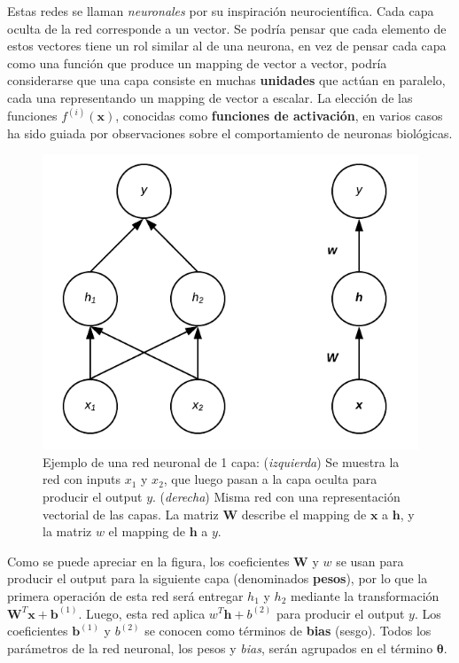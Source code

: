 Estas redes se llaman \textit{neuronales} por su inspiraci\'on neurocient\'ifica. Cada capa oculta de la red corresponde a un vector. Se podr\'ia pensar que cada elemento de estos vectores tiene un rol similar al de una neurona, en vez de pensar cada capa como una funci\'on que produce un mapping de vector a vector, podr\'ia considerarse que una capa consiste en muchas \textbf{unidades} que act\'uan en paralelo, cada una representando un mapping de vector a escalar. La elecci\'on de las funciones $f^{(i)}(\bm{x})$, conocidas como \textbf{funciones de activaci\'on}, en varios casos ha sido guiada por observaciones sobre el comportamiento de neuronas biol\'ogicas.

\begin{figure}[H]
\captionsetup{font=small,labelfont=small}
\caption{Ejemplo de una red neuronal de 1 capa: (\textit{izquierda}) Se muestra la red con inputs $x_1$ y $x_2$, que luego pasan a la capa oculta para producir el output $y$. (\textit{derecha}) Misma red con una representaci\'on vectorial de las capas. La matriz ${\bm{W}}$ describe el mapping de ${\bm{x}}$ a ${\bm{h}}$, y la matriz $w$ el mapping de ${\bm{h}}$ a $y$.}
\centering
\includegraphics[scale=.5]{img/cap7_F1NN1L.png}
\end{figure}

Como se puede apreciar en la figura, los coeficientes ${\bm{W}}$ y $w$ se usan para producir el output para la siguiente capa (denominados \textbf{pesos}), por lo que la primera operaci\'on de esta red ser\'a entregar $h_{1}$ y $h_{2}$ mediante la transformaci\'on ${\bm{W}^{T}}\bm{x} + \bm{b}^{(1)}$. Luego, esta red aplica $w^{T} \boldsymbol{h} + b^{(2)}$ para producir el output $y$. Los coeficientes $\bm{b}^{(1)}$ y  $b^{(2)}$ se conocen como t\'erminos de \textbf{bias} (sesgo). Todos los parámetros de la red neuronal, los pesos y \textit{bias}, serán agrupados en el t\'ermino $\bm{\theta}$.

